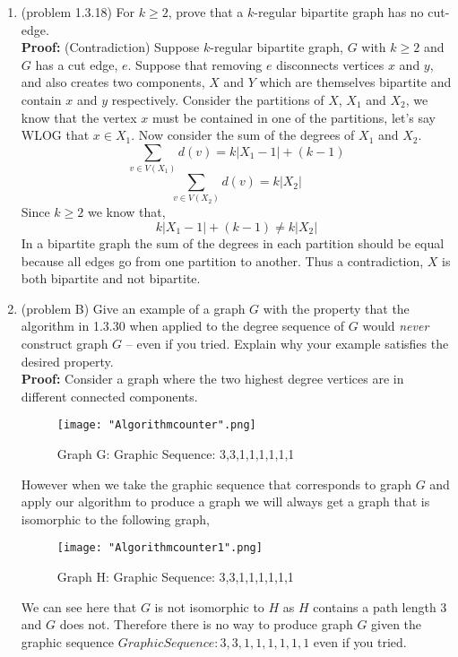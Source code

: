\documentclass{amsart}
\begin{document}
\begin{enumerate}
\vspace{.5in}

\item (problem 1.3.18) For $k \geq 2$, prove that a $k$-regular bipartite graph has no cut-edge.\\

\textbf{Proof:} (Contradiction) Suppose $k$-regular bipartite graph, $G$ with $k \geq 2$ and $G$ has a cut edge, $e$.   Suppose that removing $e$ disconnects vertices $x$ and $y$, and also creates two components, $X$ and $Y$ which are themselves bipartite and contain $x$ and $y$ respectively. Consider the partitions of $X$, $X_1$ and $X_2$, we know that the vertex $x$ must be contained in one of the partitions, let's say WLOG that $x \in X_1$. Now consider the sum of the degrees of $X_1$ and $X_2$.
\begin{equation*}
\sum_{v \in V(X_1)} d(v) = k|X_1 - 1| + ( k - 1)
\end{equation*}
\begin{equation*}
\sum_{v \in V(X_2)} d(v) = k|X_2|
\end{equation*}
Since $k \geq 2$ we know that, 
\begin{equation*}
 k|X_1 - 1| + ( k - 1) \neq k|X_2|
\end{equation*}
In a bipartite graph the sum of the degrees in each partition should be equal because all edges go from one partition to another. Thus a contradiction, $X$ is both bipartite and not bipartite.  
\vspace{.5in}

 
\item (problem B) Give an example of a graph $G$ with the property that the algorithm in 1.3.30 when applied to the degree sequence of $G$ would \emph{never} construct graph $G$ -- even if you tried. Explain why your example satisfies the desired property.\\

\textbf{Proof:} Consider a graph where the two highest degree vertices are in different connected components. 


\begin{figure}[H]
\centering
\caption{Graph G: Graphic Sequence: 3,3,1,1,1,1,1,1}
\texttt{[image: "Algorithmcounter".png]}
\end{figure}
However when we take the graphic sequence that corresponds to graph $G$ and apply our algorithm to produce a graph we will always get a graph that is isomorphic to the following graph,

\begin{figure}[H]
\centering
\caption{Graph H: Graphic Sequence: 3,3,1,1,1,1,1,1}
\texttt{[image: "Algorithmcounter1".png]}
\end{figure}
We can see here that $G$ is not isomorphic to $H$ as $H$ contains a path length 3 and $G$ does not. Therefore there is no way to produce graph $G$ given the graphic sequence $Graphic Sequence: 3,3,1,1,1,1,1,1$ even if you tried.






\end{enumerate}
\end{document}
